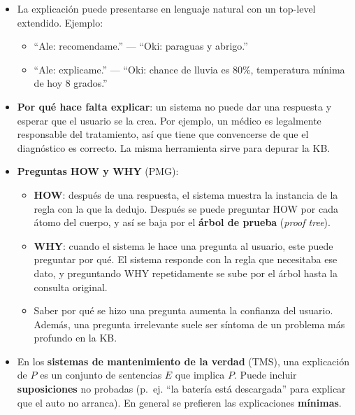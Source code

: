 \documentclass[11pt,a4paper]{article}
\begin{document}
\begin{extras}
\begin{itemize}
  \item La explicación puede presentarse en lenguaje natural con un top-level extendido. Ejemplo:
  \begin{itemize}
    \item ``Ale: recomendame.'' --- ``Oki: paraguas y abrigo.''
    \item ``Ale: explicame.'' --- ``Oki: chance de lluvia es 80\%, temperatura mínima de hoy 8 grados.''
  \end{itemize}
  \item \textbf{Por qué hace falta explicar}: un sistema no puede dar una respuesta y esperar que el usuario se la crea. Por ejemplo, un médico es legalmente responsable del tratamiento, así que tiene que convencerse de que el diagnóstico es correcto. La misma herramienta sirve para depurar la KB.
  \item \textbf{Preguntas HOW y WHY} (PMG):
  \begin{itemize}
    \item \textbf{HOW}: después de una respuesta, el sistema muestra la instancia de la regla con la que la dedujo. Después se puede preguntar HOW por cada átomo del cuerpo, y así se baja por el \textbf{árbol de prueba} (\textit{proof tree}).
    \item \textbf{WHY}: cuando el sistema le hace una pregunta al usuario, este puede preguntar por qué. El sistema responde con la regla que necesitaba ese dato, y preguntando WHY repetidamente se sube por el árbol hasta la consulta original.
    \item Saber por qué se hizo una pregunta aumenta la confianza del usuario. Además, una pregunta irrelevante suele ser síntoma de un problema más profundo en la KB.
  \end{itemize}
  \item En los \textbf{sistemas de mantenimiento de la verdad} (TMS), una explicación de $P$ es un conjunto de sentencias $E$ que implica $P$. Puede incluir \textbf{suposiciones} no probadas (p.~ej. ``la batería está descargada'' para explicar que el auto no arranca). En general se prefieren las explicaciones \textbf{mínimas}.
\end{itemize}
\end{extras}

\end{document}
